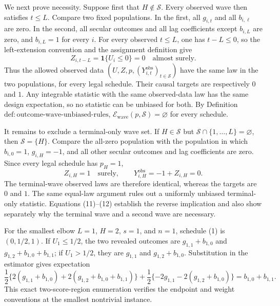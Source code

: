 We next prove necessity.  Suppose first that \(H\notin\mathcal S\).  Every observed wave then satisfies \(t\leq L\).  Compare two fixed populations.  In the first, all \(g_{i,t}\) and all \(b_{i,\ell}\) are zero.  In the second, all secular outcomes and all lag coefficients except \(b_{i,L}\) are zero, and \(b_{i,L}=1\) for every \(i\).  For every observed \(t\leq L\), one has \(t-L\leq0\), so the left-extension convention and the assignment definition give
\[
 Z_{i,t-L}=\mathbf 1\{U_i\leq0\}=0
 \quad\text{almost surely}.
\tag{11}
\]
Thus the allowed observed data \((U,Z,p,(Y^{\mathrm{obs}}_{i,t})_{t\in\mathcal S})\) have the same law in the two populations, for every legal schedule.  Their causal targets are respectively \(0\) and \(1\).  Any integrable statistic with the same observed-data law has the same design expectation, so no statistic can be unbiased for both.  By Definition \(\mathrm{def:outcome\text{-}wave\text{-}unbiased\text{-}rules}\), \(\mathcal E_{\mathrm{wave}}(p,\mathcal S)=\varnothing\) for every schedule.

It remains to exclude a terminal-only wave set.  If \(H\in\mathcal S\) but \(\mathcal S\cap\{1,\ldots,L\}=\varnothing\), then \(\mathcal S=\{H\}\).  Compare the all-zero population with the population in which \(b_{i,0}=1\), \(g_{i,H}=-1\), and all other secular outcomes and lag coefficients are zero.  Since every legal schedule has \(p_H=1\),
\[
 Z_{i,H}=1\quad\text{surely},
 \qquad
 Y^{\mathrm{obs}}_{i,H}=-1+Z_{i,H}=0.
\tag{12}
\]
The terminal-wave observed laws are therefore identical, whereas the targets are \(0\) and \(1\).  The same equal-law argument rules out a uniformly unbiased terminal-only statistic.  Equations (11)--(12) establish the reverse implication and also show separately why the terminal wave and a second wave are necessary.

For the smallest elbow \(L=1\), \(H=2\), \(s=1\), and \(n=1\), schedule (1) is \((0,1/2,1)\).  If \(U_1\leq1/2\), the two revealed outcomes are \(g_{1,1}+b_{1,0}\) and \(g_{1,2}+b_{1,0}+b_{1,1}\); if \(U_1>1/2\), they are \(g_{1,1}\) and \(g_{1,2}+b_{1,0}\).  Substitution in the estimator gives expectation
\[
 \frac12\{2(g_{1,1}+b_{1,0})+2(g_{1,2}+b_{1,0}+b_{1,1})\}
 +\frac12\{-2g_{1,1}-2(g_{1,2}+b_{1,0})\}
 =b_{1,0}+b_{1,1}.
\]
This exact two-score-region enumeration verifies the endpoint and weight conventions at the smallest nontrivial instance.